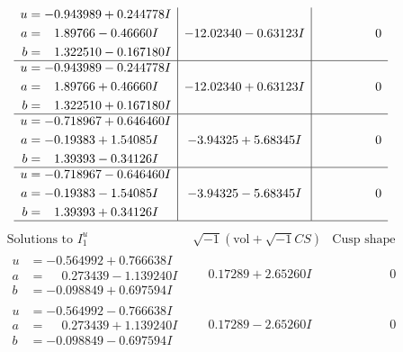 \documentclass[1p]{elsarticle_modified}
\theoremstyle{definition}
\newcommand{\I}{\sqrt{-1}}
\begin{document}
$$\begin{array}{c|c|c}
\begin{aligned}
u &= -0.943989 + 0.244778 I \\
a &= \phantom{-}1.89766 - 0.46660 I \\
b &= \phantom{-}1.322510 - 0.167180 I\end{aligned}
 & -12.02340 - 0.63123 I & \phantom{-0.000000 } 0 \\ \hline\begin{aligned}
u &= -0.943989 - 0.244778 I \\
a &= \phantom{-}1.89766 + 0.46660 I \\
b &= \phantom{-}1.322510 + 0.167180 I\end{aligned}
 & -12.02340 + 0.63123 I & \phantom{-0.000000 } 0 \\ \hline\begin{aligned}
u &= -0.718967 + 0.646460 I \\
a &= -0.19383 + 1.54085 I \\
b &= \phantom{-}1.39393 - 0.34126 I\end{aligned}
 & -3.94325 + 5.68345 I & \phantom{-0.000000 } 0 \\ \hline\begin{aligned}
u &= -0.718967 - 0.646460 I \\
a &= -0.19383 - 1.54085 I \\
b &= \phantom{-}1.39393 + 0.34126 I\end{aligned}
 & -3.94325 - 5.68345 I & \phantom{-0.000000 } 0\\
 \hline 
 \end{array}$$\newpage$$\begin{array}{c|c|c}  
\text{Solutions to }I^u_{1}& \I (\text{vol} + \sqrt{-1}CS) & \text{Cusp shape}\\
 \hline 
\begin{aligned}
u &= -0.564992 + 0.766638 I \\
a &= \phantom{-}0.273439 - 1.139240 I \\
b &= -0.098849 + 0.697594 I\end{aligned}
 & \phantom{-}0.17289 + 2.65260 I & \phantom{-0.000000 } 0 \\ \hline\begin{aligned}
u &= -0.564992 - 0.766638 I \\
a &= \phantom{-}0.273439 + 1.139240 I \\
b &= -0.098849 - 0.697594 I\end{aligned}
 & \phantom{-}0.17289 - 2.65260 I & \phantom{-0.000000 } 0 \\ \hline\begin{aligned}

\end{aligned}
\end{array}$$
\end{document}
